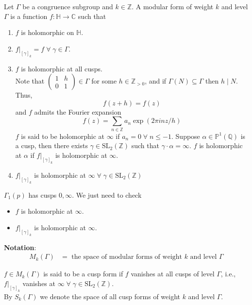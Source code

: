 \documentclass[oneside, 12pt, ]{scrbook}
\newcommand{\CC}{\mathbb C}
\newcommand{\QQ}{\mathbb Q}
\newcommand{\ZZ}{\mathbb Z}
\newcommand{\PP}{\mathbb{P}}
\newcommand{\SL}{\mathrm{SL}}
\theoremstyle{theorem}
\begin{document}
\begin{definition}
Let $\Gamma$ be a congruence subgroup and $k \in \ZZ$. A modular form of weight $k$ and level $\Gamma$ is a function $f: \mathbb{H} \rightarrow \CC$ such that 
\begin{enumerate}
\item $f$ is holomorphic on $\mathbb{H}$.
\item $f|_{[\gamma]_{k}} = f \; \forall \; \gamma \in \Gamma$.
\item $f$ is holomorphic at all cusps. \\
Note that $\begin{pmatrix}
1 & h \\ 0 & 1
\end{pmatrix} \in \Gamma$ for some $h \in \ZZ_{>0}$, and if $\Gamma(N) \subseteq \Gamma$ then $h \mid N$. Thus, $$f(z+h) = f(z)$$ and $f $ admits the Fourier expansion $$f(z) = \sum_{n \in \ZZ} a_{n} \exp(2 \pi i n z/h)$$
$f$ is said to be holomorphic at $\infty$ if $a_{n} =0 \; \forall \; n \le -1$. Suppose $\alpha \in \PP^1(\QQ)$ is a cusp, then there exists $\gamma \in \SL_{2}(\ZZ)$ such that $\gamma \cdot \alpha = \infty$. $f$ is holomorphic at $\alpha$ if $f|_{[\gamma]_{k}}$ is holomorphic at $\infty$.
\item $f|_{[\gamma]_{k}}$ is holomorphic at $\infty \; \forall \; \gamma \in \SL_{2}(\ZZ)$ 
\end{enumerate}
\end{definition}

\begin{example}
$\Gamma_{1}(p)$ has cusps $0, \infty$. We just need to check 
\begin{itemize}
\item $f$ is holomorphic at $\infty$.
\item $f|_{[\gamma]_{k}}$ is holomorphic at $\infty$.
\end{itemize}
\end{example}

\textbf{Notation}: 
\begin{align*}
M_{k}(\Gamma) &= \text{ the space of modular forms of weight $k$ and level $\Gamma$} 
\end{align*}

\begin{definition}
$f \in M_{k}(\Gamma)$ is said to be a cusp form if $f$ vanishes at all cusps of level $\Gamma$, i.e., $f|_{[\gamma]_{k}}$ vanishes at $\infty \; \forall \; \gamma \in \SL_{2}(\ZZ)$. \\

By $S_{k}(\Gamma)$ we denote the space of all cusp forms of weight $k$ and level $\Gamma$.
\end{definition}
\end{document}

